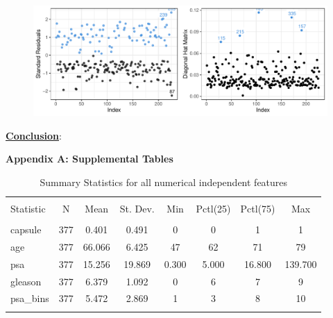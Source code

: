 \documentclass[11pt]{article}\usepackage[]{graphicx}\usepackage[]{color}
\makeatletter
\def\maxwidth{ %
  \ifdim\Gin@nat@width>\linewidth
    \linewidth
  \else
    \Gin@nat@width
  \fi
}
\makeatother
\begin{document}
\begin{figure}[h!] 
\begin{center}

\includegraphics[width=\maxwidth]{figure/unnamed-chunk-5-1} 

\caption{}
\label{model_plot_1}
\end{center} 
\end{figure}


\noindent\textbf{\underline{Conclusion}}: 
\hfill \break

\clearpage
\newpage
\noindent \Large{{\bf Appendix A: Supplemental Tables}}

\begin{center}

\begin{table}[H] \centering 
  \caption{Summary Statistics for all numerical independent features} 
  \label{descrips} 
\begin{tabular}{@{\extracolsep{5pt}}lccccccc} 
\\[-1.8ex]\hline 
\hline \\[-1.8ex] 
Statistic & \multicolumn{1}{c}{N} & \multicolumn{1}{c}{Mean} & \multicolumn{1}{c}{St. Dev.} & \multicolumn{1}{c}{Min} & \multicolumn{1}{c}{Pctl(25)} & \multicolumn{1}{c}{Pctl(75)} & \multicolumn{1}{c}{Max} \\ 
\hline \\[-1.8ex] 
capsule & 377 & 0.401 & 0.491 & 0 & 0 & 1 & 1 \\ 
age & 377 & 66.066 & 6.425 & 47 & 62 & 71 & 79 \\ 
psa & 377 & 15.256 & 19.869 & 0.300 & 5.000 & 16.800 & 139.700 \\ 
gleason & 377 & 6.379 & 1.092 & 0 & 6 & 7 & 9 \\ 
psa\_bins & 377 & 5.472 & 2.869 & 1 & 3 & 8 & 10 \\ 
\hline \\[-1.8ex] 
\end{tabular} 
\end{table} 

\end{center} 
\end{document}
